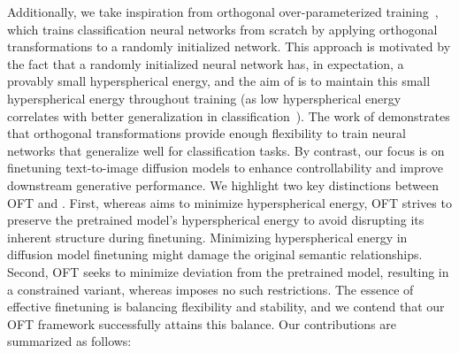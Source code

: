 Additionally, we take inspiration from orthogonal over-parameterized training~\cite{liu2021orthogonal}, which trains classification neural networks from scratch by applying orthogonal transformations to a randomly initialized network. This approach is motivated by the fact that a randomly initialized neural network has, in expectation, a provably small hyperspherical energy, and the aim of \cite{liu2021orthogonal} is to maintain this small hyperspherical energy throughout training (as low hyperspherical energy correlates with better generalization in classification~\cite{liu2018learning,lin2020regularizing}). The work of \cite{liu2021orthogonal} demonstrates that orthogonal transformations provide enough flexibility to train neural networks that generalize well for classification tasks. By contrast, our focus is on finetuning text-to-image diffusion models to enhance controllability and improve downstream generative performance. We highlight two key distinctions between OFT and \cite{liu2021orthogonal}. First, whereas \cite{liu2021orthogonal} aims to minimize hyperspherical energy, OFT strives to preserve the pretrained model's hyperspherical energy to avoid disrupting its inherent structure during finetuning. Minimizing hyperspherical energy in diffusion model finetuning might damage the original semantic relationships. Second, OFT seeks to minimize deviation from the pretrained model, resulting in a constrained variant, whereas \cite{liu2021orthogonal} imposes no such restrictions. The essence of effective finetuning is balancing flexibility and stability, and we contend that our OFT framework successfully attains this balance. Our contributions are summarized as follows:

